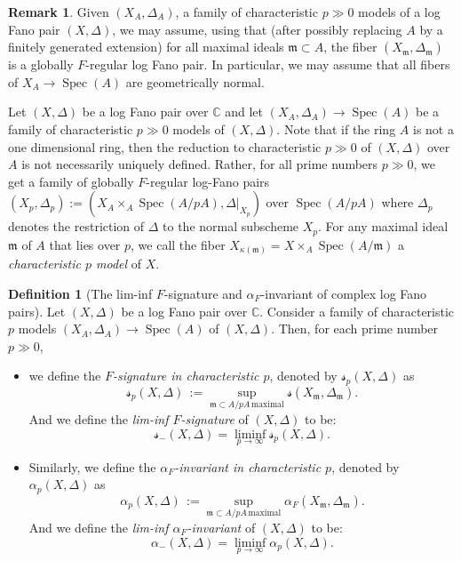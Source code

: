 \documentclass[11pt,reqno]{amsart}
\newcommand{\C}{\mathbb{C}}
\newcommand{\fm}{\mathfrak{m}}
\DeclareMathOperator{\Spec}{Spec}
\numberwithin{equation}{section}
\theoremstyle{definition}
\newtheorem{rem}[prop] {Remark}
\newtheorem{defi}[prop] {Definition}
\newcommand{\FA}{\alpha_{F}}
\newcommand{\s}{\mathscr{s}}
\begin{document}
\begin{rem}
    Given $(X_A, \Delta_A)$, a family of characteristic $p \gg 0$ models of a log Fano pair $(X, \Delta)$, we may assume, using \cite[Theorem~5.1]{SchwedeSmithLogFanoVsGloballyFRegular} that (after possibly replacing $A$ by a finitely generated extension) for all maximal ideals $\fm \subset A$, the fiber $(X_{\fm}, \Delta_\fm)$ is a globally $F$-regular log Fano pair. In particular, we may assume that all fibers of $ X_A \to \Spec(A)$ are geometrically normal. \end{rem}

Let $(X, \Delta)$ be a log Fano pair over $\C$ and let $(X_A, \Delta_A) \to \Spec(A)$ be a family of characteristic $p \gg 0$ models of $(X, \Delta)$. Note that if the ring $A$ is not a one dimensional ring, then the reduction to characteristic $p \gg 0$ of $(X, \Delta)$ over $A$ is not necessarily uniquely defined. Rather, for all prime numbers $p \gg 0$, we get a family of globally $F$-regular log-Fano pairs $ (X _{p}, \Delta_p):= (X_A \times_{A} \Spec{(A/pA)},  \Delta |_{X_p})$ over $ \Spec(A/pA)$ where $\Delta_p$ denotes the restriction of $\Delta$ to the normal subscheme $X_p$. For any maximal ideal $\fm$ of $A$ that lies over $p$, we call the fiber $X_{\kappa(\fm)} = X \times_{A} \Spec{(A/\fm)}$ a \emph{characteristic $p$ model} of $X$.  



\begin{defi}[The lim-inf $F$-signature and $\FA$-invariant of complex log Fano pairs] \label{liminfFsigdfn}
    Let $(X, \Delta)$ be a log Fano pair over $\C$. Consider a family of characteristic $p$ models $(X_A, \Delta_A) \to \Spec(A)$ of $(X, \Delta)$. Then, for each prime number $p \gg 0$,
    \begin{itemize}
        \item we define the \emph{$F$-signature in characteristic $p$}, denoted by $\s_{p}(X, \Delta)$ as
    $$ \s_{p}(X, \Delta) \,  := \sup_{\fm \subset A/pA \,  \text{maximal} } \s(X_{\fm}, \Delta_\fm). $$
    And we define the \emph{lim-inf $F$-signature} of $(X,\Delta)$ to be:
    $$ \s_{-} (X, \Delta) = \liminf_{p \to \infty} \s_{p}(X, \Delta) .$$

    \item Similarly, we define the \emph{$\FA$-invariant in characteristic $p$}, denoted by $\alpha_{p}(X, \Delta)$ as
    $$ \alpha_{p}(X, \Delta) \,  := \sup_{ \fm \subset A/pA \, \text{maximal} } \alpha_{F}(X_{\fm}, \Delta_\fm). $$
     And we define the \emph{lim-inf $\alpha_F$-invariant} of $(X, \Delta)$ to be:
    $$ \alpha_{-} (X, \Delta) = \liminf_{p \to \infty} \alpha_{p}(X, \Delta).$$    
    \end{itemize}
\end{defi}
\end{document}
